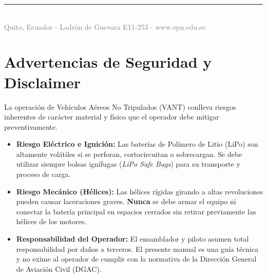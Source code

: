 \documentclass[12pt,a4paper]{article}
\begin{document}
\begin{titlepage}
    \vfill
    
    \textcolor{epnblue}{\rule{\textwidth}{1pt}}\\[0.2cm]
    \textcolor{graytext}{\scriptsize Quito, Ecuador - Ladrón de Guevara E11-253 - www.epn.edu.ec}
    
\end{titlepage}

\newpage
\tableofcontents
\newpage

\begin{abstract}
El presente documento detalla el procedimiento técnico paso a paso como reporte final para la reconstrucción del chasis, configuración electrónica y de software de un vehículo aéreo no tripulado (cuadricóptero) utilizando un controlador de vuelo de la familia Cube (ej. Cube Black) con firmware ArduPilot, emisora Flysky FS-i6X y los softwares de estación terrena (QGroundControl y Mission Planner). Se documentan las observaciones descubiertas durante el ensamblaje, resolución de problemas de hardware, integración de módulos GNSS de precisión, telemetría avanzada, sintonización de PID en vuelo y protocolos operativos de seguridad civil para su despliegue en ecosistemas altoandinos.
\end{abstract}

\vspace{1cm}

\section*{Advertencias de Seguridad y Disclaimer}

\begin{warningbox}[title=Precauciones Críticas de Seguridad Operativa]
La operación de Vehículos Aéreos No Tripulados (VANT) conlleva riesgos inherentes de carácter material y físico que el operador debe mitigar preventivamente.
\begin{itemize}[leftmargin=*]
    \item \textbf{Riesgo Eléctrico e Ignición:} Las baterías de Polímero de Litio (LiPo) son altamente volátiles si se perforan, cortocircuitan o sobrecargan. Se debe utilizar siempre bolsas ignífugas (\textit{LiPo Safe Bags}) para su transporte y proceso de carga.
    \item \textbf{Riesgo Mecánico (Hélices):} Las hélices rígidas girando a altas revoluciones pueden causar laceraciones graves. \textbf{Nunca} se debe armar el equipo ni conectar la batería principal en espacios cerrados sin retirar previamente las hélices de los motores.
    \item \textbf{Responsabilidad del Operador:} El ensamblador y piloto asumen total responsabilidad por daños a terceros. El presente manual es una guía técnica y no exime al operador de cumplir con la normativa de la Dirección General de Aviación Civil (DGAC).
\end{itemize}
\end{warningbox}
\end{document}
